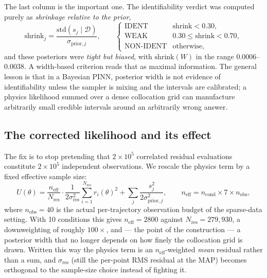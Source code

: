 \documentclass[11pt]{article}
\begin{document}
The last column is the important one. The identifiability verdict was computed
purely as \emph{shrinkage relative to the prior},
\begin{equation}
\mathrm{shrink}_j = \frac{\mathrm{std}(s_j \mid \mathcal{D})}
{\sigma_{\text{prior},j}},
\qquad
\begin{cases}
\text{IDENT} & \mathrm{shrink} < 0.30,\\
\text{WEAK} & 0.30 \le \mathrm{shrink} < 0.70,\\
\text{NON-IDENT} & \text{otherwise},
\end{cases}
\label{eq:shrink}
\end{equation}
and these posteriors were \emph{tight but biased}, with
$\mathrm{shrink}(W)$ in the range $0.0006$--$0.0038$. A width-based criterion
reads that as maximal information. The general lesson is that in a Bayesian
PINN, posterior width is not evidence of identifiability unless the sampler is
mixing and the intervals are calibrated; a physics likelihood summed over a
dense collocation grid can manufacture arbitrarily small credible intervals
around an arbitrarily wrong answer.

\subsection{The corrected likelihood and its effect}

The fix is to stop pretending that $2\times10^5$ correlated residual
evaluations constitute $2\times10^5$ independent observations. We rescale the
physics term by a fixed effective sample size:
\begin{equation}
U(\theta) = \frac{n_{\text{eff}}}{N_{\text{res}}}\cdot
\frac{1}{2\sigma_{\text{res}}^2}\sum_{i=1}^{N_{\text{res}}} r_i(\theta)^2
+ \sum_j \frac{s_j^2}{2\sigma_{\text{prior},j}^2},
\qquad
n_{\text{eff}} = n_{\text{cond}} \times 7 \times n_{\text{obs}},
\label{eq:goodpotential}
\end{equation}
where $n_{\text{obs}} = 40$ is the actual per-trajectory observation budget of
the sparse-data setting. With 10 conditions this gives $n_{\text{eff}} = 2800$
against $N_{\text{res}} = 279{,}930$, a downweighting of roughly $100\times$,
and --- the point of the construction --- a posterior width that no longer
depends on how finely the collocation grid is drawn. Written this way the
physics term is an $n_{\text{eff}}$-weighted \emph{mean} residual rather than a
sum, and $\sigma_{\text{res}}$ (still the per-point RMS residual at the MAP)
becomes orthogonal to the sample-size choice instead of fighting it.
\end{document}
